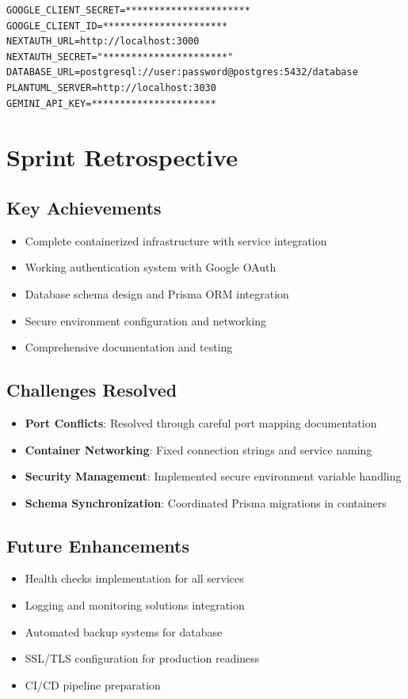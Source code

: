 \begin{lstlisting}[caption=Environment Variables]
GOOGLE_CLIENT_SECRET=**********************
GOOGLE_CLIENT_ID=**********************
NEXTAUTH_URL=http://localhost:3000
NEXTAUTH_SECRET="**********************"
DATABASE_URL=postgresql://user:password@postgres:5432/database
PLANTUML_SERVER=http://localhost:3030
GEMINI_API_KEY=**********************
\end{lstlisting}

\section{Sprint Retrospective}

\subsection{Key Achievements}
\begin{itemize}
    \item  Complete containerized infrastructure with service integration
    \item  Working authentication system with Google OAuth
    \item  Database schema design and Prisma ORM integration
    \item  Secure environment configuration and networking
    \item  Comprehensive documentation and testing
\end{itemize}

\subsection{Challenges Resolved}
\begin{itemize}
    \item \textbf{Port Conflicts}: Resolved through careful port mapping documentation
    \item \textbf{Container Networking}: Fixed connection strings and service naming
    \item \textbf{Security Management}: Implemented secure environment variable handling
    \item \textbf{Schema Synchronization}: Coordinated Prisma migrations in containers
\end{itemize}

\subsection{Future Enhancements}
\begin{itemize}
    \item Health checks implementation for all services
    \item Logging and monitoring solutions integration
    \item Automated backup systems for database
    \item SSL/TLS configuration for production readiness
    \item CI/CD pipeline preparation
\end{itemize}

